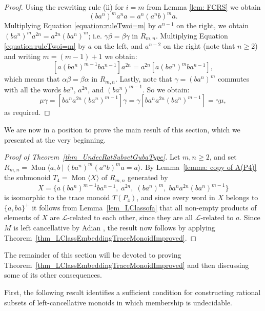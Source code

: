\documentclass{amsart}
\newcommand{\Mpres}[2]{\operatorname{Mon}\bigl\langle #1\:|\:#2 \bigr\rangle}
\newcommand{\Mgen}[1]{\operatorname{Mon}\bigl\langle #1 \bigr\rangle}
\newcommand{\M}{R_{m,n}}
\newcommand{\gl}{\mathcal{L}}
\theoremstyle{plain}
\theoremstyle{definition}
\begin{document}
\begin{proof}
Using the rewriting rule (ii) for $i = m$ from Lemma \ref{lem: FCRS} we obtain
\begin{equation}\label{equation:ruleTwoi=m}
(ba^n)^m a^n a = a^n (a^n b)^{m} a.
\end{equation}
Multiplying Equation \eqref{equation:ruleTwoi=m} by $a^{n-1}$ on the right, we obtain $(ba^n)^m a^{2n} = a^{2n} (ba^n)^{m}$; i.e. $\gamma\beta = \beta\gamma$ in $R_{m,n}$.
Multiplying Equation \eqref{equation:ruleTwoi=m} by $a$ on the left, and $a^{n-2}$ on the right (note that $n \geq 2$) and writing $m = (m-1) + 1$ we obtain:
\[
[a(ba^n)^{m-1} ba^{n-1}]a^{2n}= a^{2n} [a(ba^n)^{m} ba^{n-1}],
\]
which means that $\alpha\beta = \beta\alpha$ in $R_{m,n}$.
Lastly, 
note that $\gamma = (ba^n)^m$ commutes with all the  words $ba^{n}$,  $a^{2n}$, and $(ba^n)^{m-1}$. So we obtain:
\[
\mu \gamma = [ba^n a^{2n} (ba^n)^{m-1}] \gamma = \gamma [ba^n a^{2n} (ba^n)^{m-1}] = \gamma \mu,
\]
as required. 
\end{proof}


We are now in a position to prove the main result of this section, which we presented at the very beginning.

\begin{proof}[Proof of Theorem~\ref{thm_UndecRatSubsetGubaType}]
Let $m,n \geq 2$,  and set $\M= \Mpres{a, b}{(b a^n)^m(a^n b)^ma = a}$. 
By Lemma~\ref{lemma: copy of A(P4)} the submonoid $T_4 = \Mgen{X}$ of $\M$ generated by
\[
X =  
\{ 
a(ba^n)^{m-1} b a^{n-1}, \;
a^{2n},  \;
(ba^n)^m,  \;
ba^n a^{2n} (ba^n)^{m-1}
\} 
\]
is isomorphic to the trace monoid $T(P_4)$, and since every word in $X$ belongs to  $\{a,ba\}^+$ it follows from 
Lemma~\ref{lem_LClassofa} that all non-empty products of elements of $X$ are $\gl$-related to each other, since they are all $\gl$-related to $a$.   
Since $M$ is left cancellative by   
Adian \cite[Theorem~3]{Adian1960}, 
the result now follows by applying 
Theorem~\ref{thm_LClassEmbeddingTraceMonoidImproved}. 
\end{proof}

The remainder of this section will be devoted to proving Theorem~\ref{thm_LClassEmbeddingTraceMonoidImproved} and then discussing some of its other consequences.  

First, the following result identifies a sufficient condition for constructing rational subsets of left-cancellative monoids in which membership is undecidable.   
\end{document}
